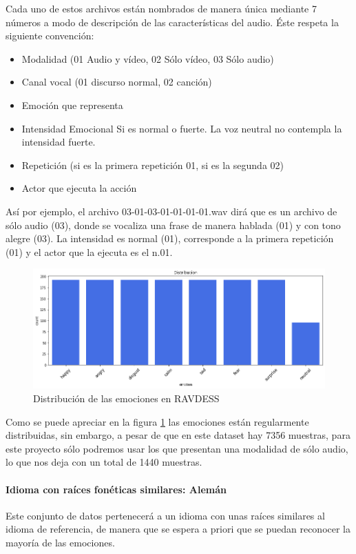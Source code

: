 \documentclass[11pt,a4paper,spanish]{book}
\begin{document}
	Cada uno de estos archivos están nombrados de manera única mediante 7 números a modo de descripción de las características del audio. Éste respeta la siguiente convención:
	\begin{itemize}
		\item Modalidad (01 Audio y vídeo, 02 Sólo vídeo, 03 Sólo audio)
		\item Canal vocal (01 discurso normal, 02 canción)
		\item Emoción que representa
		\item Intensidad Emocional Si es normal o fuerte. La voz neutral no contempla la intensidad fuerte.
		\item Repetición (si es la primera repetición 01, si es la segunda 02)
		\item Actor que ejecuta la acción
	\end{itemize}

	Así por ejemplo, el archivo 03-01-03-01-01-01-01.wav dirá que es un archivo de sólo audio (03), donde se vocaliza una frase de manera hablada (01) y con tono alegre (03). La intensidad es normal (01), corresponde a la primera repetición (01) y el actor que la ejecuta es el n.01.
	
	\begin{figure}[H]
		\centering
		\includegraphics[scale=0.35]{ravdess_distribucion.png} 
		\caption{Distribución de las emociones en RAVDESS}
		\label{fig:emociones_ravdess}
	\end{figure}
	
	Como se puede apreciar en la figura \ref{fig:emociones_ravdess} las emociones están regularmente distribuidas, sin embargo, a pesar de que en este dataset hay 7356 muestras, para este proyecto sólo podremos usar los que presentan una modalidad de sólo audio, lo que nos deja con un total de 1440 muestras. 

	
	\paragraph{Idioma con raíces fonéticas similares: Alemán} Este conjunto de datos pertenecerá a un idioma con unas raíces similares al idioma de referencia, de manera que se espera a priori que se puedan reconocer la mayoría de las emociones.\\
	
\end{document}
